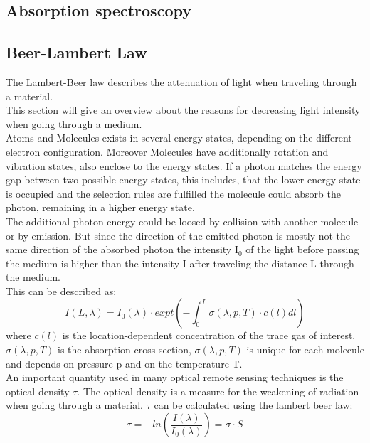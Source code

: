 \documentclass  [
  paper    = a4,
  BCOR     = 10mm,
  twoside,
  fontsize = 12pt,
  fleqn,
  toc      = bibnumbered,
  toc      = listofnumbered,
  numbers  = noendperiod,
  headings = normal,
  listof   = leveldown,
  version  = 3.03
]                                       {scrreprt}
\begin{document}
	\subsection{Absorption spectroscopy}
	\subsection*{Beer-Lambert Law}
	The Lambert-Beer law describes the attenuation of light when traveling through a material.\\
	This section will give an overview about the reasons for decreasing light intensity when going through a medium.\\
	Atoms and Molecules exists in several energy states, depending on the different electron configuration. Moreover Molecules have additionally rotation and vibration states, also enclose to the energy states. If a photon matches the energy gap between two possible energy states, this includes, that the lower energy state is occupied and the selection rules are fulfilled  the molecule could absorb the photon, remaining in a higher energy state.\\
	The additional photon energy could be loosed by collision with another molecule or by emission. But since the direction of the emitted photon is mostly not the same direction of the absorbed photon the intensity I$_{0}$ of the light before passing the medium is higher than the intensity I after traveling the distance L through the medium.\\
	This can be described as:\\ 
	\begin{equation}
	I\left(L,\lambda\right) = I_{0}\left(\lambda\right)\cdot expt\left(-\int^{L}_{0}\sigma\left(\lambda,p,T\right)\cdot c\left(l\right)dl\right)
	\end{equation}
	where $c\left(l\right)$ is the location-dependent concentration of the trace gas of interest. $\sigma\left(\lambda,p,T\right)$ is the absorption cross section, $\sigma\left(\lambda,p,T\right)$ is unique for each molecule and depends on pressure p and on the temperature T.\\
	An important quantity used in many optical remote sensing techniques is the optical density $\tau$. The optical density is a measure for the weakening of radiation when going through a material. $\tau$ can be calculated using the lambert beer law:
	\begin{equation}
	\tau = -ln\left(\frac{I\left(\lambda\right)}{I_{0}\left(\lambda\right)}\right) = \sigma\cdot S
	\end{equation}
\end{document}
